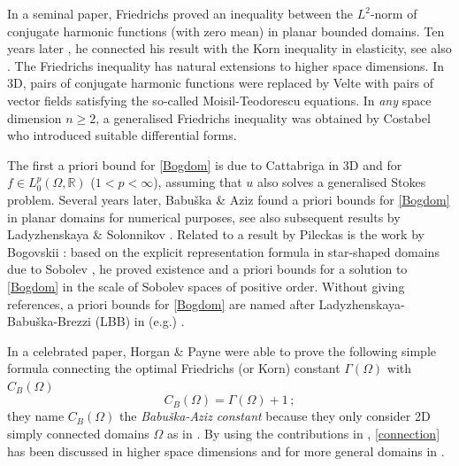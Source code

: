 \documentclass[11pt]{article}
\theoremstyle{plain}
\theoremstyle{definition}
\numberwithin{equation}{section}
\newcommand{\R}{\mathbb{R}}
\begin{document}
In a seminal paper, Friedrichs \cite{friedrichs1937certain} proved an inequality between the $L^2$-norm of conjugate harmonic functions (with
zero mean) in planar bounded domains. Ten years later \cite{friedrichs}, he connected his result with the Korn inequality \cite{korn} in elasticity, see also \cite{horganzamp}.
The Friedrichs inequality has natural extensions to
higher space dimensions. In 3D, pairs of conjugate harmonic functions were replaced by Velte \cite[(1)]{velte1998inequalities} with
pairs of vector fields satisfying the so-called Moisil-Teodorescu equations. In {\em any} space dimension $n\ge2$, a generalised Friedrichs
inequality was obtained by Costabel \cite[(1.10)]{costabel2017inequalities} who introduced suitable differential forms.\par
The first a priori bound for \eqref{Bogdom} is due to Cattabriga \cite{cattabriga1961problema} in 3D and for $f\in L^p_0(\Omega,\R)$
($1<p<\infty$), assuming that $u$ also solves a generalised Stokes problem. Several years later, Babu\v{s}ka \& Aziz \cite{babuska} found a priori bounds
for \eqref{Bogdom} in planar domains for numerical purposes, see also subsequent results by Ladyzhenskaya \& Solonnikov
\cite{ladyzhenskaya1978some}. Related to a result by Pileckas \cite{pileckas} is the work by Bogovskii \cite{bogovskii1979solution,bogovskii1980}:
based on the explicit representation formula in star-shaped domains due to Sobolev \cite[Formula (7.9)]{sobolev1963}, he proved existence and a priori bounds for a solution to \eqref{Bogdom} in the scale of Sobolev spaces of positive order.
Without giving references, a priori bounds for \eqref{Bogdom} are named after Ladyzhenskaya-Babu\v{s}ka-Brezzi (LBB) in (e.g.)
\cite{Bernardi,Chizhonkov_Olshanskii_2000}.

In a celebrated paper, Horgan \& Payne \cite{horgan} were able to prove the following simple formula connecting the optimal  Friedrichs (or Korn)
constant $\Gamma(\Omega)$ with $C_B(\Omega)$
\begin{equation}\label{connection}
	C_B(\Omega)=\Gamma(\Omega)+1\, ;
\end{equation}
they name $C_B(\Omega)$ the \textit{Babu\v{s}ka-Aziz constant} because they only consider 2D simply connected domains $\Omega$ as in \cite{babuska}.
By using the contributions in \cite{costabel2017inequalities,velte1998inequalities}, \eqref{connection} has been discussed in higher
space dimensions and for more general domains in \cite{acosta2017divergence,costabel,Costa-McIntosh,duran2012elementary,geissert2006equation,Guzman,ladyzhenskaya1978some,Payne2007,zsuppan2016,zsuppan2018,zsuppan2020}.\par
\end{document}
